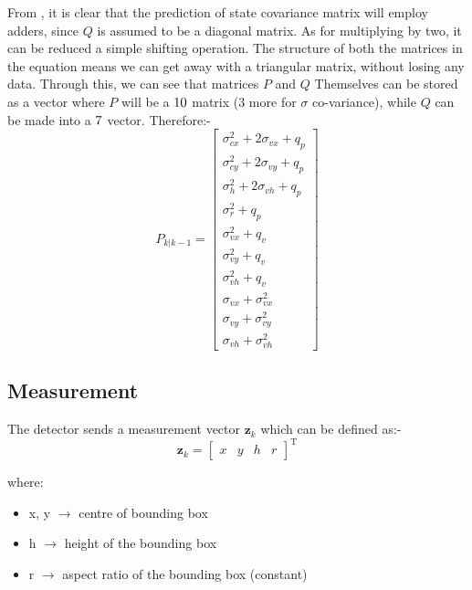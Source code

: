 \documentclass[10pt]{article}
\begin{document}
    \noindent From , it is clear that the prediction of state covariance matrix will employ adders, since \(Q\) is assumed to be a diagonal matrix.
    As for multiplying by two, it can be reduced a simple shifting operation. The structure of both the matrices in the equation means we can get away with a triangular matrix, 
    without losing any data. Through this, we can see that matrices \(P\) and \(Q\) Themselves can be stored as a vector where \(P\) will be a \(10 \time 1\) matrix (3 more 
    for \(\sigma\) co-variance), while \(Q\) can be made into a \(7 \time 1\) vector. Therefore:-
    \begin{equation}
        P_{k|k-1} = \begin{bmatrix}
            \sigma^2_{cx} + 2\sigma_{vx} + q_p \\
            \sigma^2_{cy} + 2\sigma_{vy} + q_p \\
            \sigma^2_h + 2\sigma_{vh} + q_p \\
            \sigma^2_r + q_p \\
            \sigma^2_{vx} + q_v \\
            \sigma^2_{vy} + q_v \\
            \sigma^2_{vh} + q_v \\
            \sigma_{vx} + \sigma^2_{vx} \\
            \sigma_{vy} + \sigma^2_{vy} \\
            \sigma_{vh} + \sigma^2_{vh}
        \end{bmatrix}
        \label{Eq:Cov_Predict}
    \end{equation}
    
    \subsection{Measurement}
    
    The detector sends a measurement vector \(\mathbf{z}_k\) which can be defined as:- 
    \[
        \mathbf{z}_k = \begin{bmatrix}x & y & h & r\end{bmatrix}^\text{T}
    \]

    where:
    \begin{itemize}
        \item x, y \(\rightarrow\) centre of bounding box
        \item h \(\rightarrow\) height of the bounding box
        \item r \(\rightarrow\) aspect ratio of the bounding box (constant)
    \end{itemize}
\end{document}
